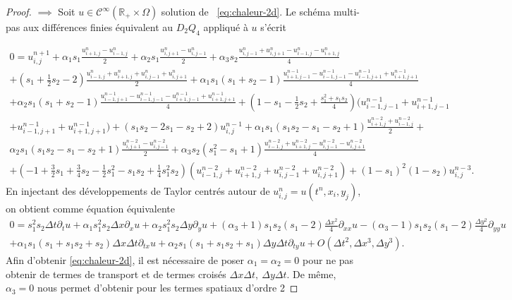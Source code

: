 \documentclass{article}
\begin{document}
\begin{proof}
$\implies$ Soit $u \in \mathcal{C}^\infty (\mathbb{R}_+ \times \Omega)$ solution de ~\eqref{eq:chaleur-2d}. Le schéma multi-pas aux différences finies équivalent au $D_2Q_4$ appliqué à $u$ s'écrit

\begin{multline*}
0 = u_{i,j}^{n+1} + \alpha_1 s_1 \frac{u_{i+1,j}^n-u_{i-1,j}^n}{2} + \alpha_2 s_1 \frac{u_{i,j+1}^n-u_{i,j-1}^n}{2} + \alpha_3 s_2 \frac{u_{i,j-1}^n + u_{i,j+1}^n - u_{i-1,j}^n - u_{i+1,j}^n}{4}\\
+ \left(s_1 + \frac12 s_2 - 2\right) \frac{u_{i-1,j}^n+u_{i+1,j}^n+u_{i,j-1}^n+u_{i,j+1}^n}{2} + \alpha_1 s_1 (s_1 + s_2 - 1) \frac{u_{i+1, j-1}^{n-1}-u_{i-1,j-1}^{n-1}-u_{i-1,j+1}^{n-1}+u_{i+1,j+1}^{n-1}}{4}\\
+ \alpha_2 s_1(s_1 + s_2 - 1) \frac{u_{i-1,j+1}^{n-1} - u_{i-1,j-1}^{n-1} - u_{i+1,j-1}^{n-1}+u_{i+1,j+1}^{n-1}}{4} + \left(1-s_1-\frac{1}{2}s_2 + \frac{s_1^2 + s_1s_2}{4}\right) (u_{i-1,j-1}^{n-1}+u_{i+1,j-1}^{n-1} \\ + u_{i-1,j+1}^{n-1}+u_{i+1,j+1}^{n-1}) + \left(s_1s_2 -2 s_1 - s_2 + 2\right) u_{i,j}^{n-1} + \alpha_1 s_1 (s_1s_2 - s_1 - s_2 + 1) \frac{u_{i+1,j}^{n-2}+u_{i-1,j}^{n-2}}{2} + \\
\alpha_2 s_1 (s_1s_2 - s_1 - s_2 + 1) \frac{u_{i,j+1}^{n-2}-u_{i,j-1}^{n-2}}{2}
+ \alpha_3 s_2 (s_1^2 - s_1 + 1) \frac{u_{i-1,j}^{n-2}+u_{i+1,j}^{n-2}-u_{i,j-1}^{n-2}-u_{i,j+1}^{n-2}}{4} \\
+ \left(-1 + \frac{3}{2}s_1 + \frac{3}{4}s_2 - \frac{1}{2}s_1^2 - s_1s_2 + \frac{1}{4}s_1^2s_2\right) (u_{i-1,j}^{n-2}+u_{i+1,j}^{n-2}+u_{i,j-1}^{n-2}+u_{i,j+1}^{n-2}) + (1-s_1)^2(1-s_2) u_{i,j}^{n-3}.
\end{multline*}
En injectant des développements de Taylor centrés autour de $u_{i,j}^n = u(t^n, x_i, y_j)$, on obtient comme équation équivalente
\begin{multline*}
    0 = s_1^2s_2 \Delta t \partial_t u + \alpha_1 s_1^2s_2 \Delta x \partial_x u + \alpha_2s_1^2s_2 \Delta y \partial_y u + (\alpha_3 + 1)s_1s_2(s_1-2) \frac{\Delta x^2}{4} \partial_{xx} u - (\alpha_3 - 1) s_1s_2(s_1-2)\frac{\Delta y^2}{4} \partial_{yy} u \\
    + \alpha_1 s_1(s_1 + s_1s_2 + s_2) \Delta x \Delta t \partial_{tx} u + \alpha_2 s_1 (s_1 + s_1s_2 + s_1) \Delta y \Delta t \partial_{ty} u + O(\Delta t^2, \Delta x^3, \Delta y^3).
\end{multline*}
Afin d'obtenir \eqref{eq:chaleur-2d}, il est nécessaire de poser $\alpha_1 = \alpha_2 = 0$ pour ne pas obtenir de termes de transport et de termes croisés $\Delta x \Delta t, \ \Delta y \Delta t$. De même, $\alpha_3 = 0$ nous permet d'obtenir pour les termes spatiaux d'ordre 2

\end{proof}
\end{document}
